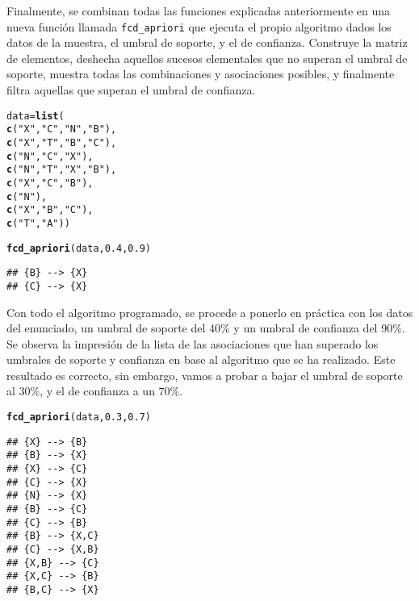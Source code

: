 \documentclass[12pt]{report}\usepackage[]{graphicx}\usepackage[dvipsnames]{xcolor}
\makeatletter
\newcommand{\hlnum}[1]{\textcolor[rgb]{0.686,0.059,0.569}{#1}}%
\newcommand{\hlstr}[1]{\textcolor[rgb]{0.192,0.494,0.8}{#1}}%
\newcommand{\hlstd}[1]{\textcolor[rgb]{0.345,0.345,0.345}{#1}}%
\newcommand{\hlkwb}[1]{\textcolor[rgb]{0.69,0.353,0.396}{#1}}%
\newcommand{\hlkwd}[1]{\textcolor[rgb]{0.737,0.353,0.396}{\textbf{#1}}}%
\newenvironment{kframe}{%
 \def\at@end@of@kframe{}%
 \ifinner\ifhmode%
  \def\at@end@of@kframe{\end{minipage}}%
  \begin{minipage}{\columnwidth}%
 \fi\fi%
 \def\FrameCommand##1{\hskip\@totalleftmargin \hskip-\fboxsep
 \colorbox{shadecolor}{##1}\hskip-\fboxsep
     \hskip-\linewidth \hskip-\@totalleftmargin \hskip\columnwidth}%
 \MakeFramed {\advance\hsize-\width
   \@totalleftmargin\z@ \linewidth\hsize
   \@setminipage}}%
 {\par\unskip\endMakeFramed%
 \at@end@of@kframe}
\newenvironment{knitrout}{}{} %
\makeatother
\begin{document}
			Finalmente, se combinan todas las funciones explicadas anteriormente en una nueva función llamada \texttt{fcd\_apriori} que ejecuta el propio algoritmo dados los datos de la muestra, el umbral de soporte, y el de confianza. Construye la matriz de elementos, deshecha aquellos sucesos elementales que no superan el umbral de soporte, muestra todas las combinaciones y asociaciones posibles, y finalmente filtra aquellas que superan el umbral de confianza.
			
\begin{knitrout}
\color{fgcolor}\begin{kframe}
\begin{alltt}
\hlstd{data} \hlkwb{=} \hlkwd{list}\hlstd{(}
\hlkwd{c}\hlstd{(}\hlstr{"X"}\hlstd{,} \hlstr{"C"}\hlstd{,} \hlstr{"N"}\hlstd{,} \hlstr{"B"}\hlstd{),}
\hlkwd{c}\hlstd{(}\hlstr{"X"}\hlstd{,} \hlstr{"T"}\hlstd{,} \hlstr{"B"}\hlstd{,} \hlstr{"C"}\hlstd{),}
\hlkwd{c}\hlstd{(}\hlstr{"N"}\hlstd{,} \hlstr{"C"}\hlstd{,} \hlstr{"X"}\hlstd{),}
\hlkwd{c}\hlstd{(}\hlstr{"N"}\hlstd{,} \hlstr{"T"}\hlstd{,} \hlstr{"X"}\hlstd{,} \hlstr{"B"}\hlstd{),}
\hlkwd{c}\hlstd{(}\hlstr{"X"}\hlstd{,} \hlstr{"C"}\hlstd{,} \hlstr{"B"}\hlstd{),}
\hlkwd{c}\hlstd{(}\hlstr{"N"}\hlstd{),}
\hlkwd{c}\hlstd{(}\hlstr{"X"}\hlstd{,} \hlstr{"B"}\hlstd{,} \hlstr{"C"}\hlstd{),}
\hlkwd{c}\hlstd{(}\hlstr{"T"}\hlstd{,} \hlstr{"A"}\hlstd{))}

\hlkwd{fcd_apriori}\hlstd{(data,} \hlnum{0.4}\hlstd{,} \hlnum{0.9}\hlstd{)}
\end{alltt}
\begin{verbatim}
## {B} --> {X}
## {C} --> {X}
\end{verbatim}
\end{kframe}
\end{knitrout}
			
			Con todo el algoritmo programado, se procede a ponerlo en práctica con los datos del enunciado, un umbral de soporte del 40\% y un umbral de confianza del 90\%. Se observa la impresión de la lista de las asociaciones que han superado los umbrales de soporte y confianza en base al algoritmo que se ha realizado. Este resultado es correcto, sin embargo, vamos a probar a bajar el umbral de soporte al 30\%, y el de confianza a un 70\%. 
			
\begin{knitrout}
\color{fgcolor}\begin{kframe}
\begin{alltt}
\hlkwd{fcd_apriori}\hlstd{(data,} \hlnum{0.3}\hlstd{,} \hlnum{0.7}\hlstd{)}
\end{alltt}
\begin{verbatim}
## {X} --> {B}
## {B} --> {X}
## {X} --> {C}
## {C} --> {X}
## {N} --> {X}
## {B} --> {C}
## {C} --> {B}
## {B} --> {X,C}
## {C} --> {X,B}
## {X,B} --> {C}
## {X,C} --> {B}
## {B,C} --> {X}
\end{verbatim}
\end{kframe}
\end{knitrout}
			
\end{document}
